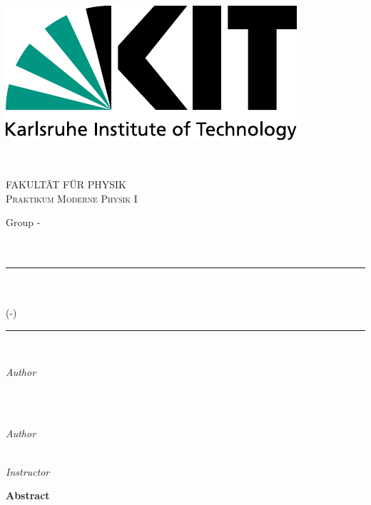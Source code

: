 \begin{titlepage}

	\newcommand{\Hrule}{\rule{\linewidth}{0.5mm}}
	\begin{minipage}{0.5\textwidth}
		\begin{flushleft}
			\includegraphics[width=.5\textwidth]{../praktikum-protokollvorlage-latex/include/logo.pdf}
		\end{flushleft}
	\end{minipage}
	~
	\begin{minipage}{0.5\textwidth}
		\begin{flushright}
			\textsc{FAKULTÄT FÜR PHYSIK\\Praktikum Moderne Physik I}
		\end{flushright}
	\end{minipage}\par

	\center
	{\LARGE Group \wochentag-\gruppennr}\\[1.5cm]
	{\Large \emailadressen}\\[0.5cm]
	{\large \durchgefuehrt}\\[0.5cm]

	\Hrule\\[0.4cm]
	{\huge\bfseries \versuch}\\[0.2cm]
	(\praktikum-\versuchsnr)\\[0.4cm]
	\Hrule\\[1.5cm]

	\begin{minipage}{0.4\textwidth}
		\begin{flushleft}
			\large
			\textit{Author}\\
			\vornamea\ \textsc{\nachnamea}
		\end{flushleft}
	\end{minipage}
	~
	\begin{minipage}{0.4\textwidth}
		\begin{flushright}
			\large
			\textit{Author}\\
			\vornameb\ \textsc{\nachnameb}
		\end{flushright}
	\end{minipage}\par
	\textit{Instructor}\\
	\betreuer

	\vfill\vfill
	{\LARGE \textbf{Abstract}}\\[0.4cm]

	\abstract

\end{titlepage}
